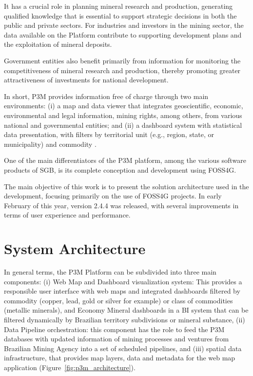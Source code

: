 \documentclass{isprs} %
\begin{document}
It has a crucial role in planning mineral research and production, generating qualified knowledge that is essential to support strategic decisions in both the public and private sectors. For industries and investors in the mining sector, the data available on the Platform contribute to supporting development plans and the exploitation of mineral deposits. 

Government entities also benefit primarily from information for monitoring the competitiveness of mineral research and production, thereby promoting greater attractiveness of investments for national development.

In short, P3M provides information free of charge through two main environments: (i) a map and data viewer that integrates geoscientific, economic, environmental and legal information, mining rights, among others, from various national and governmental entities; and (ii) a dashboard system with statistical data presentation, with filters by territorial unit (e.g., region, state, or municipality) and commodity \cite{almeida2025}.

One of the main differentiators of the P3M platform, among the various software products of SGB, is its complete conception and development using FOSS4G. 

The main objective of this work is to present the solution architecture used in the development, focusing primarily on the use of FOSS4G projects. In early February of this year, version 2.4.4 was released, with several improvements in terms of user experience and performance.


\section{System Architecture}\label{SYSTEM_ARCHITECTURE}

In general terms, the P3M Platform can be subdivided into three main components: (i) Web Map and Dashboard visualization system: This provides a responsible user interface with web maps and integrated dashboards filtered by commodity (copper, lead, gold or silver for example) or class of commodities (metallic minerals), and Economy Mineral dashboards in a BI system that can be filtered dynamically by Brazilian territory subdivisions or mineral substance, (ii) Data Pipeline orchestration: this component has the role to feed the P3M databases with updated information of mining processes and ventures from Brazilian Mining Agency into a set of scheduled pipelines, and (iii) spatial data infrastructure, that provides map layers, data and metadata for the web map application (Figure~\ref{fig:p3m_architecture}). 
\end{document}
